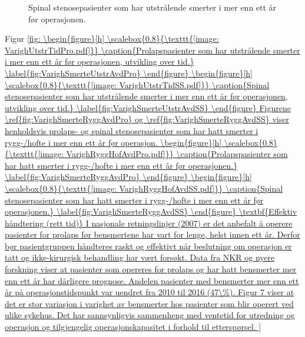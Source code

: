 \documentclass [norsk,a4paper,twoside]{article}\usepackage[]{graphicx}\usepackage[]{color}
\begin{document}
\begin{figure}[h] 
      \caption{Spinal stenosepasienter som har utstrålende smerter i mer enn ett år før operasjonen.}
      \label{fig:VarighSmerteUtstrAvdSS}
\end{figure}

Figur \ref{fig: 
\begin{figure}[h] 
      \scalebox{0.8}{\texttt{[image: VarighUtstrTidPro.pdf]}}
      \caption{Prolapspasienter som har utstrålende smerter i mer enn ett år før operasjonen, utvikling over tid.}
      \label{fig:VarighSmerteUtstrAvdPro}
\end{figure}

\begin{figure}[h] 
      \scalebox{0.8}{\texttt{[image: VarighUtstrTidSS.pdf]}}
      \caption{Spinal stenosepasienter som har utstrålende smerter i mer enn ett år før operasjonen, utvikling over tid.}
      \label{fig:VarighSmerteUtstrAvdSS}
\end{figure}

Figurene \ref{fig:VarighSmerteRyggAvdPro} og \ref{fig:VarighSmerteRyggAvdSS} viser henholdsvis prolaps- og spinal stenosepasienter som har hatt smerter i rygg-/hofte i mer enn ett år før operasjon.


\begin{figure}[h] 
\scalebox{0.8}{\texttt{[image: VarighRyggHofAvdPro.pdf]}}
\caption{Prolapspasienter som har hatt smerter i rygg-/hofte
i mer enn ett år før operasjonen.}
\label{fig:VarighSmerteRyggAvdPro}
\end{figure}
\begin{figure}[h] 
\scalebox{0.8}{\texttt{[image: VarighRyggHofAvdSS.pdf]}}
\caption{Spinal stenosepasienter som har hatt smerter i rygg-/hofte
i mer enn ett år før operasjonen.}
\label{fig:VarighSmerteRyggAvdSS}
\end{figure}


\textbf{Effektiv håndtering (rett tid)}

I nasjonale retningslinjer (2007) er det anbefalt å operere pasienter for prolaps før
bensmertene har vart for lenge, helst innen ett år. Derfor bør
pasientgruppen håndteres raskt og effektivt når beslutning om operasjon er tatt og
ikke-kirurgisk behandling har vært forsøkt. Data fra NKR og nyere forskning viser at
pasienter som opereres for prolaps og har hatt bensmerter mer enn ett år har
dårligere prognose. Andelen pasienter med bensmerter mer enn ett år på
operasjonstidspunkt var uendret fra 2010 til 2016 (47\%).
Figur 7 viser at det er stor variasjon i varighet av bensmerter hos pasienter som blir
operert ved ulike sykehus. Det har sannsynligvis sammenheng med ventetid for
utredning og operasjon og tilgjengelig operasjonskapasitet i forhold til etterspørsel.


}
\end{document}

